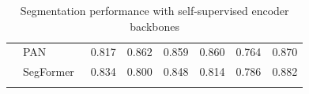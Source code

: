\begin{table}
\begin{tabular}{llrrrrrr}
		                         & PAN~\cite{DBLP:journals/corr/abs-1805-10180}              & 0.817                             & 0.862                                  & 0.859                               & 0.860                                 & 0.764                               & 0.870                               \\
		                         & SegFormer~\cite{xie2021segformer}                         & 0.834                             & 0.800                                  & 0.848                               & 0.814                                 & 0.786                               & 0.882                               \\
		\bottomrule{}
	\end{tabular}
	\caption{Segmentation performance with self-supervised encoder backbones}
	\label{tab:ssl-enc-seg}
	

\end{table}

